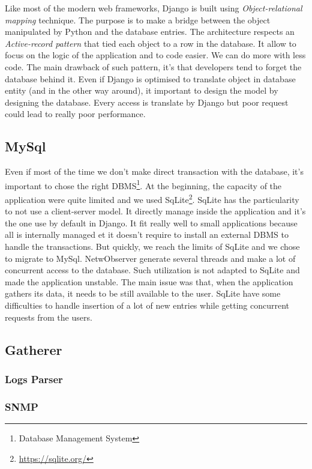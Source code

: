 Like most of the modern web frameworks, Django is built using \emph{Object-relational mapping} technique. The purpose is to make a bridge between the object manipulated by Python and the database entries. The architecture respects an \emph{Active-record pattern} that tied each object to a row in the database. It allow to focus on the logic of the application and to code easier. We can do more with less code. The main drawback of such pattern, it's that developers tend to forget the database behind it. Even if Django is optimised to translate object in database entity (and in the other way around), it important to design the model by designing the database. Every access is translate by Django but poor request could lead to really poor performance.

\subsection{MySql}
Even if most of the time we don't make direct transaction with the database, it's important to chose the right DBMS\footnote{Database Management System}. At the beginning, the capacity of the application were quite limited and we used SqLite\footnote{\url{https://sqlite.org/}}. SqLite has the particularity to not use a client-server model. It directly manage inside the application and it's the one use by default in Django. It fit really well to small applications because all is internally managed et it doesn't require to install an external DBMS to handle the transactions. But quickly, we reach the limits of SqLite and we chose to migrate to MySql. NetwObserver generate several threads and make a lot of concurrent access to the database. Such utilization is not adapted to SqLite and made the application unstable. The main issue was that, when the application gathers its data, it needs to be still available to the user. SqLite have some difficulties to handle insertion of a lot of new entries while getting concurrent requests from the users.

\subsection{Gatherer}
\subsubsection{Logs Parser}
\subsubsection{SNMP}

